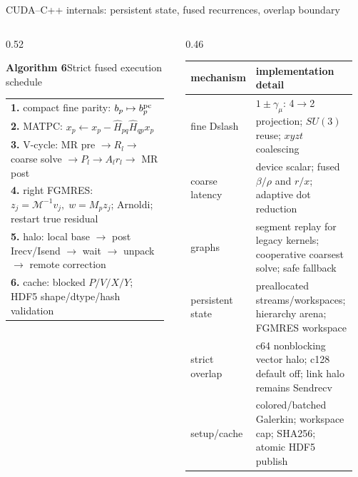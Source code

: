 \documentclass[UTF8,aspectratio=169,11pt,fontset=none]{ctexbeamer}
\begin{document}
\begin{frame}[t,shrink=3]{CUDA--C++ internals: persistent state, fused recurrences, overlap boundary}
\begin{columns}[T,totalwidth=\textwidth]
\begin{column}{0.52\textwidth}
\begin{center}\textbf{Algorithm 6}\quad Strict fused execution schedule\end{center}
\small
\begin{tabular}{@{}>{\raggedright\arraybackslash}p{0.96\linewidth}@{}}
\toprule
\textbf{1.} compact fine parity: \(b_p\mapsto b_p^{\rm pc}\)\\
\textbf{2.} MATPC: \(x_p\leftarrow x_p-\widehat H_{pq}\widehat H_{qp}x_p\)\\
\textbf{3.} V-cycle: MR pre \(\to R_l\to\) coarse solve
\(\to P_l\to A_lr_l\to\) MR post\\
\textbf{4.} right FGMRES: \(z_j=\mathcal M^{-1}v_j,\;w=M_pz_j\);
Arnoldi; restart true residual\\
\textbf{5.} halo: local base \(\to\) post Irecv/Isend \(\to\) wait
\(\to\) unpack \(\to\) remote correction\\
\textbf{6.} cache: blocked \(P/V/X/Y\); HDF5 shape/dtype/hash validation\\
\bottomrule
\end{tabular}
\end{column}
\begin{column}{0.46\textwidth}
\footnotesize
\begin{tabular}{@{}p{0.24\linewidth}p{0.69\linewidth}@{}}
\toprule
mechanism & implementation detail\\
\midrule
fine Dslash & \(1\pm\gamma_\mu\): 4\(\to\)2 projection; \(SU(3)\) reuse; \(xyzt\) coalescing\\
coarse latency & device scalar; fused \(\beta/\rho\) and \(r/x\); adaptive dot reduction\\
graphs & segment replay for legacy kernels; cooperative coarsest solve; safe fallback\\
persistent state & preallocated streams/workspaces; hierarchy arena; FGMRES workspace\\
strict overlap & c64 nonblocking vector halo; c128 default off; link halo remains Sendrecv\\
setup/cache & colored/batched Galerkin; workspace cap; SHA256; atomic HDF5 publish\\
\bottomrule
\end{tabular}
\end{column}
\end{columns}
\end{frame}
\end{document}
